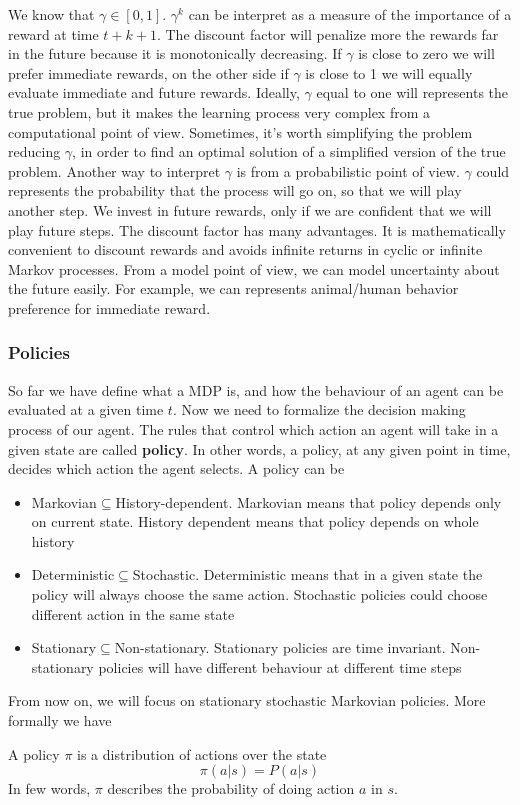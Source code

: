 \documentclass[../main.tex]{subfiles}
\begin{document}
We know that $\gamma \in [0,1]$. $\gamma^k$ can be interpret as a measure of the importance of a reward at time $t+k+1$. The discount factor will penalize more the rewards far in the future because it is monotonically decreasing. If $\gamma$ is close to zero we will prefer immediate rewards, on the other side if $\gamma$ is close to 1 we will equally evaluate immediate and future rewards. Ideally, $\gamma$ equal to one will represents the true problem, but it makes the learning process very complex from a computational point of view. Sometimes, it's worth simplifying the problem reducing $\gamma$, in order to find an optimal solution of a simplified version of the true problem. Another way to interpret $\gamma$ is from a probabilistic point of view. $\gamma$ could represents the probability that the process will go on, so that we will play another step. We invest in future rewards, only if we are confident that we will play future steps. The discount factor has many advantages. It is mathematically convenient to discount rewards and avoids infinite returns in cyclic or infinite Markov processes. From a model point of view, we can model uncertainty about the future easily. For example, we can represents animal/human behavior preference for immediate reward.

\subsubsection{Policies} So far we have define what a MDP is, and how the behaviour of an agent can be evaluated at a given time $t$. Now we need to formalize the decision making process of our agent. The rules that control which action an agent will take in a given state are called \textbf{policy}. In other words, a policy, at any given point in time, decides which action the agent selects. A policy can be
\begin{itemize}
    \item Markovian$\subseteq$History-dependent. Markovian means that policy depends only on current state. History dependent means that policy depends on whole history
    \item Deterministic$\subseteq$Stochastic. Deterministic means that in a given state the policy will always choose the same action. Stochastic policies could choose different action in the same state
    \item Stationary$\subseteq$Non-stationary. Stationary policies are time invariant. Non-stationary policies will have different behaviour at different time steps
\end{itemize}
From now on, we will focus on stationary stochastic Markovian policies. More formally we have
\begin{definition}
    A policy $\pi$ is a distribution of actions over the state
    \begin{equation*}
        \pi(a|s) = P(a|s)
    \end{equation*}
    In few words, $\pi$ describes the probability of doing action $a$ in $s$.
\end{definition}
\end{document}

